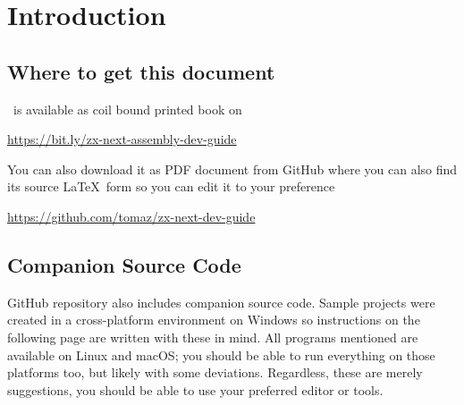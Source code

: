 \chapter{Introduction}


\ChapterTOC[]	%


\section{Where to get this document}

\BookTitle ~is available as coil bound printed book on

\url{https://bit.ly/zx-next-assembly-dev-guide}

You can also download it as PDF document from GitHub where you can also find its source \LaTeX ~form so you can edit it to your preference

\url{https://github.com/tomaz/zx-next-dev-guide}


\section{Companion Source Code}

GitHub repository also includes companion source code. Sample projects were created in a cross-platform environment on Windows so instructions on the following page are written with these in mind. All programs mentioned are available on Linux and macOS; you should be able to run everything on those platforms too, but likely with some deviations. Regardless, these are merely suggestions, you should be able to use your preferred editor or tools.



